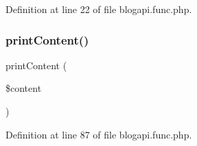 Definition at line 22 of file blogapi.\+func.\+php.

\hypertarget{blogapi_8func_8php_aee14687cb1bc033360baef8b634ab27e}{}\label{blogapi_8func_8php_aee14687cb1bc033360baef8b634ab27e} 
\subsubsection{\texorpdfstring{print\+Content()}{printContent()}}
{\footnotesize\ttfamily print\+Content (\begin{DoxyParamCaption}\item[{}]{\$content }\end{DoxyParamCaption})}



Definition at line 87 of file blogapi.\+func.\+php.

